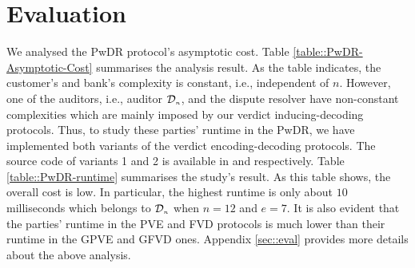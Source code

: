 

\vspace{-2.5mm}
\section{Evaluation}%






We analysed the PwDR protocol's asymptotic cost. Table \ref{table::PwDR-Asymptotic-Cost} summarises the analysis result.  As the table indicates, the customer's and bank's complexity is constant,  i.e., independent of $n$. However, one of the auditors, i.e., auditor $\mathcal{D}_{\scriptscriptstyle n}$, and the dispute resolver have non-constant complexities which are mainly imposed by our verdict inducing-decoding protocols. Thus, to study these parties' runtime in the PwDR, we have implemented both variants of the verdict encoding-decoding protocols. The source code of  variants 1 and 2 is available in \cite{variant-1} and \cite{variant-2} respectively.  Table \ref{table::PwDR-runtime} summarises the study's result. As this table shows,  the overall cost is low. In particular, the highest runtime is only about $10$ milliseconds which belongs to $\mathcal{D}_{\scriptscriptstyle n}$ when $n=12$ and $e=7$. It is also evident that the parties' runtime in the PVE and FVD protocols is much lower than their runtime in the GPVE and GFVD ones.  Appendix \ref{sec::eval} provides more details about the above    analysis.



\vspace{-1mm}



